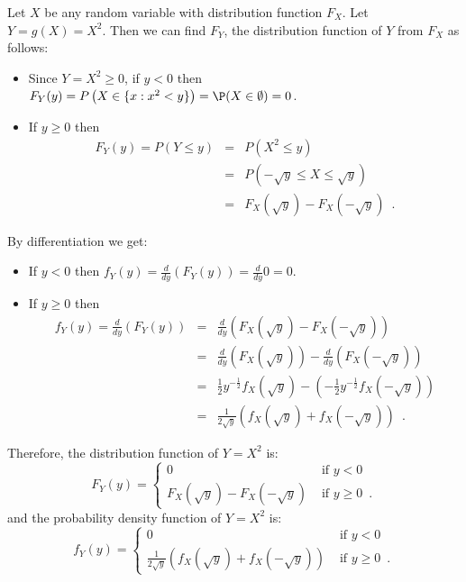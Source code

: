 \begin{example}\label{Exm:DirectMethodforYisXSquared}
Let $X$ be any random variable with distribution function $F_X$.  Let $Y=g(X)=X^2$.  
Then we can find $F_Y$, the distribution function of $Y$ from $F_X$ as follows:
\begin{itemize}
\item {Since $Y=X^2 \geq 0$, if $y < 0$ then $F_Y(y) = P\left( X \in \{ x : x^2 < y\} \right) = \P(X \in \emptyset) = 0$.}
\item {If $y \geq 0$ then
\begin{eqnarray*}
F_Y(y) = P \left(Y \leq y \right) 
&=& P \left( X^2 \leq y \right) \\
&=& P \left( -\sqrt{y} \leq X \leq \sqrt{y} \right) \\
&=& F_X(\sqrt{y}) - F_X(-\sqrt{y}) \enspace .
\end{eqnarray*}
}
\end{itemize}
By differentiation we get:
\begin{itemize}
\item {If $y<0$ then $f_Y(y)=\frac{d}{dy}(F_Y(y)) = \frac{d}{dy} 0 = 0$.}
\item {If $y \geq 0$ then
\begin{eqnarray*}
f_Y(y) 
= \frac{d}{dy}\left( F_Y(y) \right) 
&=& \frac{d}{dy}\left( F_X(\sqrt{y}) - F_X( - \sqrt{y}) \right)\\
&=& \frac{d}{dy}\left( F_X(\sqrt{y}) \right) - \frac{d}{dy}\left( F_X( - \sqrt{y}) \right)\\
&=& \frac{1}{2}y^{-\frac{1}{2}} f_X(\sqrt{y}) - \left( -\frac{1}{2}y^{-\frac{1}{2}} f_X( - \sqrt{y}) \right)\\
&=& \frac{1}{2 \sqrt{y}} \left( f_X(\sqrt{y}) + f_X( - \sqrt{y}) \right) \enspace .
\end{eqnarray*}
}
\end{itemize}
Therefore, the distribution function of $Y=X^2$ is:
\begin{equation}\label{E:F_YofX^2}
F_Y(y) = 
\begin{cases}
0 & \text{ if } y < 0 \\
F_X(\sqrt{y}) - F_X(-\sqrt{y}) & \text{ if } y \geq 0 \enspace .
\end{cases}
\end{equation}
and the probability density function of $Y=X^2$ is:
\begin{equation}\label{E:f_YofX^2}
f_Y(y) = 
\begin{cases}
0 & \text{ if } y < 0 \\
\frac{1}{2 \sqrt{y}} \left( f_X(\sqrt{y}) + f_X( - \sqrt{y}) \right) & \text{ if } y \geq 0 \enspace .
\end{cases}
\end{equation}
\end{example} 


